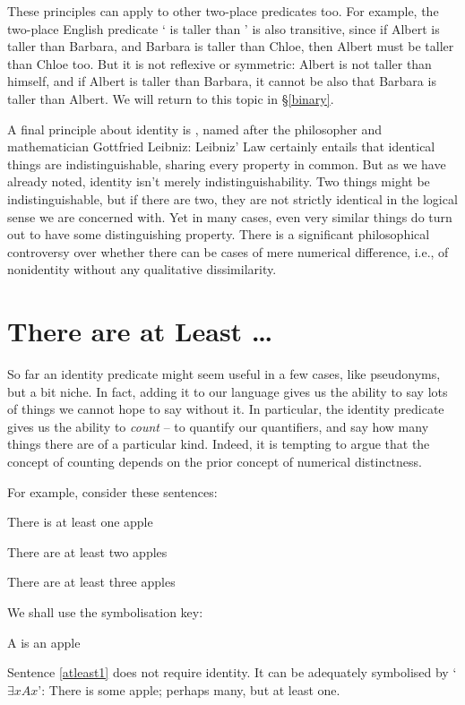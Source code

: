 These principles can apply to other two-place predicates too. For example, the two-place English predicate ` is taller than ' is also transitive, since if Albert is taller than Barbara, and Barbara is taller than Chloe, then Albert must be taller than Chloe too. But it is not reflexive or symmetric: Albert is not taller than himself, and if Albert is taller than Barbara, it cannot be also that Barbara is taller than Albert. We will return to this topic in §\ref{binary}.

A final principle about identity is , named after the philosopher and mathematician Gottfried Leibniz:  
Leibniz' Law certainly entails that identical things are indistinguishable, sharing every property in common. But as we have already noted, identity isn't merely indistinguishability. Two things might be indistinguishable, but if there are two, they are not strictly identical in the logical sense we are concerned with. Yet in many cases, even very similar things do turn out to have some distinguishing property. There is a significant philosophical controversy over whether there can be cases of mere numerical difference, i.e., of nonidentity without any qualitative dissimilarity. 




\section{There are at Least …} \label{s:atleast}

So far an identity predicate might seem useful in a few cases, like pseudonyms, but a bit niche. In fact, adding it to our language gives us the ability to say lots of things we cannot hope to say without it. In particular, the identity predicate gives us the ability to \emph{count} – to quantify our quantifiers, and say how many things there are of a particular kind. Indeed, it is tempting to argue that the concept of counting depends on the prior concept of numerical distinctness.

For example, consider these sentences:
\begin{earg}
\item[\ex{atleast1}] There is at least one apple
\item[\ex{atleast2}] There are at least two apples
\item[\ex{atleast3}] There are at least three apples
\end{earg}
We shall use the symbolisation key:
	\begin{ekey}
		\item[A]  is an apple
	\end{ekey}
Sentence \ref{atleast1} does not require identity. It can be adequately symbolised by `$\exists x Ax$': There is some apple; perhaps many, but at least one.

